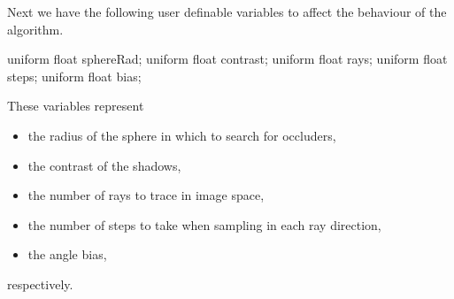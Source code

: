 Next we have the following user definable variables to affect the
behaviour of the algorithm.
\begin{cppcode}
  uniform float sphereRad;
  uniform float contrast;
  uniform float rays;
  uniform float steps;
  uniform float bias;
\end{cppcode}
These variables represent
\begin{itemize}
\item the radius of the sphere in which to search for occluders,
\item the contrast of the shadows,
\item the number of rays to trace in image space,
\item the number of steps to take when sampling in each ray direction,
\item the angle bias, 
\end{itemize}
respectively.

